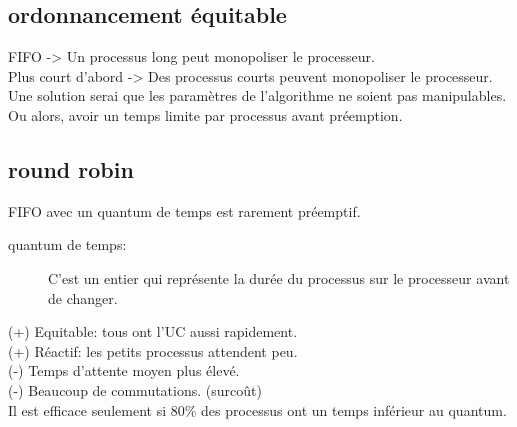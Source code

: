 \documentclass[a4paper, 9pt]{article}
\begin{document}
        \subsection{ordonnancement équitable}
            FIFO -> Un processus long peut monopoliser le processeur.\\
            Plus court d'abord -> Des processus courts peuvent monopoliser le processeur.\\
            Une solution serai que les paramètres de l'algorithme ne soient pas manipulables. Ou alors, avoir un temps limite par processus avant préemption.\newline
        \subsection{round robin}
            FIFO avec un quantum de temps  est rarement préemptif.
            \begin{description}
                \item[quantum de temps:] C'est un entier qui représente la durée du processus sur le processeur avant de changer.
            \end{description}
            (+) Equitable: tous ont l'UC aussi rapidement.\\
            (+) Réactif: les petits processus attendent peu.\\
            (-) Temps d'attente moyen plus élevé.\\
            (-) Beaucoup de commutations. (surcoût)\\
            Il est efficace seulement si 80\% des processus ont un temps inférieur au quantum.
            
\end{document}
